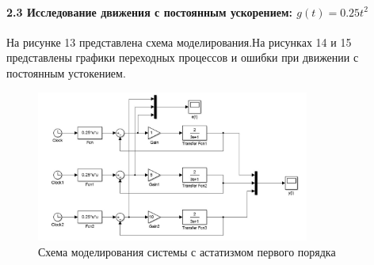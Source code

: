 \documentclass[a4paper, 12pt]{article}
\begin{document}
\paragraph{2.3 Исследование движения с постоянным ускорением: $g(t) = 0.25t^2$}\hfill\par
На рисунке 13 представлена схема моделирования.На рисунках 14 и 15 представлены графики переходных процессов и ошибки при движении с постоянным устокением.
\begin{figure}[h]
	\centering
	\includegraphics[width = 0.8\textwidth]{sxema5}
	\caption{Схема моделирования системы с астатизмом первого порядка}
\end{figure}
\end{document}
